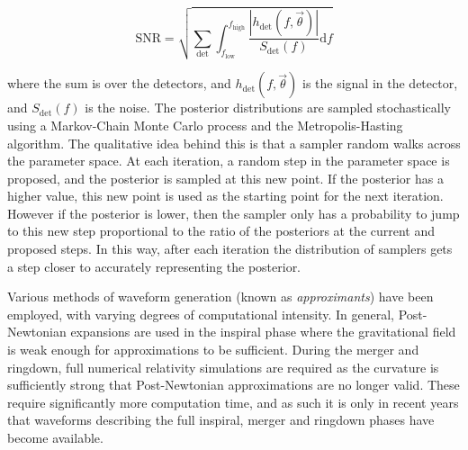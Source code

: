 \documentclass[11pt]{article}
\begin{document}
\begin{equation}
\mathrm{SNR}=\sqrt{\sum_{\mathrm{det}}^{}\int_{f_{\mathrm{low}}}^{f_{\mathrm{high}}}\frac{|h_{\mathrm{det}}(f,\vec{\theta})|}{S_{\mathrm{det}}(f)}\mathrm{d}f}
\end{equation}

\noindent where the sum is over the detectors, and $h_{\mathrm{det}}(f,\vec{\theta})$ is the signal in the detector, and $S_{\mathrm{det}}(f)$ is the noise. The posterior distributions are sampled stochastically using a Markov-Chain Monte Carlo process and the Metropolis-Hasting algorithm. The qualitative idea behind this is that a sampler random walks across the parameter space. At each iteration, a random step in the parameter space is proposed, and the posterior is sampled at this new point. If the posterior has a higher value, this new point is used as the starting point for the next iteration. However if the posterior is lower, then the sampler only has a probability to jump to this new step proportional to the ratio of the posteriors at the current and proposed steps. In this way, after each iteration the distribution of samplers gets a step closer to accurately representing the posterior.

Various methods of waveform generation (known as \textit{approximants}) have been employed, with varying degrees of computational intensity. In general, Post-Newtonian expansions are used in the inspiral phase where the gravitational field is weak enough for approximations to be sufficient. During the merger and ringdown, full numerical relativity simulations are required as the curvature is sufficiently strong that Post-Newtonian approximations are no longer valid\cite{waveforms}\cite{imr}. These require significantly more computation time, and as such it is only in recent years that waveforms describing the full inspiral, merger and ringdown phases have become available.
\end{document}
